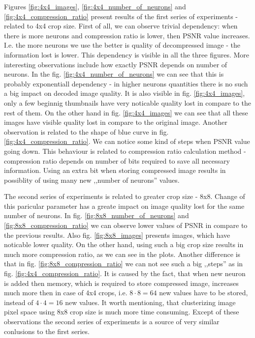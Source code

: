 \documentclass[../IDP_Task5_Karwowski_Kowalewski.tex]{subfiles}
\begin{document}
 {
    Figures \ref{fig:4x4_images}, \ref{fig:4x4_number_of_neurons} and
    \ref{fig:4x4_compression_ratio} present results of the first series of experiments - related to
    4x4 crop size. First of all, we can observe trivial dependency: when there is more neurons and
    compression ratio is lower, then PSNR value increases. I.e. the more neurons we use the better
    is quality of decompressed image - the information lost is lower. This dependency is visible in
    all the three figures. More interesting observations include how exactly PSNR depends on number
    of neurons. In the fig. \ref{fig:4x4_number_of_neurons} we can see that this is probably
    exponentiall dependency - in higher neurons quantities there is no such a big impact on decoded
    image quality. It is also visible in fig. \ref{fig:4x4_images}, only a few beginnig thumbnails
    have very noticable quality lost in compare to the rest of them. On the other hand in fig.
    \ref{fig:4x4_images} we can see that all these images have visible quality lost in compare to
    the original image. Another observation is related to the shape of blue curve in fig.
    \ref{fig:4x4_compression_ratio}. We can notice some kind of steps when PSNR value going down.
    This behaviour is related to compression ratio calculation method - compression ratio depends on
    number of bits required to save all necessary information. Using an extra bit when storing
    compressed image results in possiblity of using many new ,,number of neurons'' values.

    The second series of experiments is related to greater crop size - 8x8. Change of this paricular
    parameter has a greate impact on image quality lost for the same number of neurons. In fig.
    \ref{fig:8x8_number_of_neurons} and \ref{fig:8x8_compression_ratio} we can observe lower values
    of PSNR in compare to the previous results. Also fig. \ref{fig:8x8_images} presents images,
    which have noticable lower quality. On the other hand, using such a big crop size results in
    much more compression ratio, as we can see in the plots. Another difference is that in fig.
    \ref{fig:8x8_compression_ratio} we can not see such a big ,,steps'' as in fig.
    \ref{fig:4x4_compression_ratio}. It is caused by the fact, that when new neuron is added then
    memory, which is required to store compressed image, increases much more then in case of 4x4
    crops, i.e. $8 \cdot 8 = 64$ new values have to be stored, instead of $4 \cdot 4 = 16$ new
    values. It worth mentioning, that clusterizing image pixel space using 8x8 crop size is much
    more time consuming. Except of these observations the second series of experiments is a source
    of very similar conlusions to the first series.
}
\end{document}
